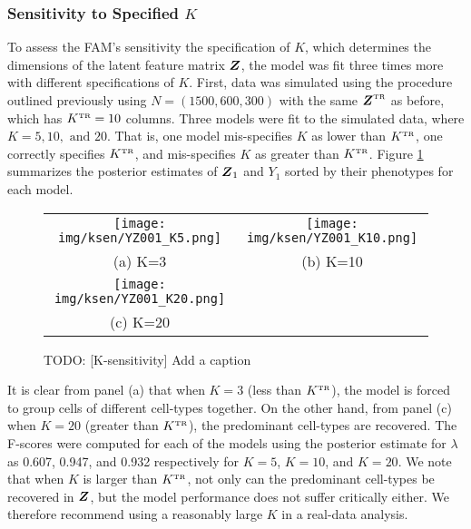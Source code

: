 \documentclass[12pt,]{article}
\newcommand{\true}{{\mbox{\tiny TR}}}
\newcommand{\bZ}{\mbox{\boldmath $Z$}}
\begin{document}
\subsubsection{Sensitivity to Specified $K$}\label{sec:ksens}
To assess the FAM's sensitivity the specification of $K$, which determines the
dimensions of the latent feature matrix $\bZ$, the model was fit three times
more with different specifications of $K$. First, data was simulated using the
procedure outlined previously using $N=(1500, 600, 300)$ with the same
$\bZ^\true$ as before, which has $K^\true=10$ columns. Three models were fit to
the simulated data, where $K=5, 10, \text{ and } 20$. That is, one model
mis-specifies $K$ as lower than $K^\true$, one correctly specifies $K^\true$,
and mis-specifies $K$ as greater than $K^\true$.
Figure \ref{fig:ksen-post-Z} summarizes the posterior estimates of $\bZ_1$
and $Y_1$ sorted by their phenotypes for each model.
\begin{figure}%
\begin{center}
  \begin{tabular}{cc}
  \texttt{[image: img/ksen/YZ001\_K5.png]}&
  \texttt{[image: img/ksen/YZ001\_K10.png]}\\
  {\small (a) K=3} & {\small (b) K=10} \\
  \texttt{[image: img/ksen/YZ001\_K20.png]}& \\
  {\small (c) K=20} &\\
  \end{tabular}
\end{center}
\vspace{-0.05in}
\caption{TODO: [K-sensitivity] Add a caption}
\label{fig:ksen-post-Z}
\end{figure}
It is clear from panel (a) that when $K=3$ (less than $K^\true$), the model is
forced to group cells of different cell-types together. On the other hand, 
from panel (c) when $K=20$ (greater than $K^\true$), the predominant cell-types
are recovered. 
The F-scores were computed for each of the models using the posterior estimate
for $\lambda$ as 0.607, 0.947, and 0.932 respectively for $K=5$, $K=10$, and
$K=20$. We note that when $K$ is larger than $K^\true$, not only can the
predominant cell-types be recovered in $\bZ$, but the model performance does
not suffer critically either. We therefore recommend using a reasonably large
$K$ in a real-data analysis.


\end{document}
